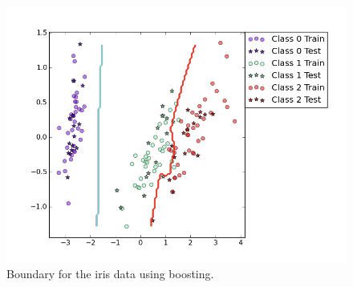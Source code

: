 \documentclass[a4paper,10pt]{article}
\begin{document}
\FloatBarrier
\begin{figure}[h!]
  \center
  \includegraphics[width = 150mm]{figure_3.png}
  \vspace{-15mm}

  \begin{minipage}[t]{95mm}
    \caption{
      Boundary for the iris data using boosting.
    }
    \label{FIGas3}
  \end{minipage}
\end{figure}
\FloatBarrier
\end{document}
